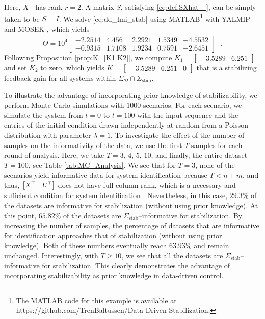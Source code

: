 \documentclass[9pt,shortpaper,twoside,web]{ieeecolor}
\begin{document}
Here, $X_{-}$ has rank $r=2$. A matrix $S$, satisfying \eqref{eq:def:SXhat_-}, can be simply taken to be $S = I$.
We solve \eqref{eq:dd_lmi_stab} using MATLAB\footnote{The MATLAB code for this example is available at https://github.com/TrenBaltussen/Data-Driven-Stabilization.} with YALMIP \cite{yalmip} and MOSEK \cite{mosek}, which yields
\begin{equation}
\Theta \!=\! 10^4\begin{bmatrix}
-2.2514 & 4.456 & 2.2921 & 1.5349 & -4.5532 \\
-0.9315 & 1.7108 & 1.9234 & 0.7591 & -2.6451
\end{bmatrix}^\top\!\!.
\end{equation}
Following Proposition \ref{prop:K=[K1 K2]}, we compute $ K_1 = \begin{bmatrix} -3.5289 & 6.251 \end{bmatrix}$ and set $K_2$ to zero, which yields $K = \begin{bmatrix}
    -3.5289 & 6.251 & 0
\end{bmatrix}$ that is a stabilizing feedback gain for all systems within $\Sigma_\mathcal{D}\cap\Sigma_{\text{stab}}$.

To illustrate the advantage of incorporating prior knowledge of stabilizability, we perform Monte Carlo simulations with $1000$ scenarios. For each scenario, we simulate the system from $t=0$ to $t = 100$ with the input sequence and the entries of the initial condition drawn independently at random from a Poisson distribution with parameter $\lambda = 1$. To investigate the effect of the number of samples on the informativity of the data, we use the first $T$ samples for each round of analysis. Here, we take $T=3$, $4$, $5$, $10$, and finally, the entire dataset $T=100$, see Table \ref{tab:MC_Analysis}. We see that for $T = 3$, none of the scenarios yield informative data for system identification because $T<n+m$, and thus, $\small \begin{bmatrix} X_-^\top & U_-^\top \end{bmatrix}$ does not have full column rank, which is a necessary and sufficient condition for system identification \cite[Prop. 6]{van2020data}. Nevertheless, in this case, $29.3\%$ of the datasets are informative for stabilization (without using prior knowledge). At this point, $65.82 \%$ of the datasets are $\Sigma_{\text{stab}}$--informative for stabilization. By increasing the number of samples, the percentage of datasets that are informative for identification approaches that of stabilization (without using prior knowledge). Both of these numbers eventually reach $63.93\%$ and remain unchanged. Interestingly, with $T\geq10$, we see that all the datasets are $\Sigma_{\text{stab}}$--informative for stabilization.
This clearly demonstrates the advantage of incorporating stabilizability as prior knowledge in data-driven control.
\end{document}
